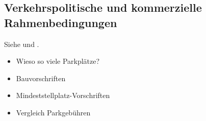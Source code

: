 \subsection{Verkehrspolitische und kommerzielle Rahmenbedingungen}

Siehe \cite{ltw_technische_studie} und \cite{leitfaden_vorarlberg}.

\begin{itemize}
  \item Wieso so viele Parkplätze?
  \item Bauvorschriften
  \item Mindeststellplatz-Vorschriften
  \item Vergleich Parkgebühren
\end{itemize}